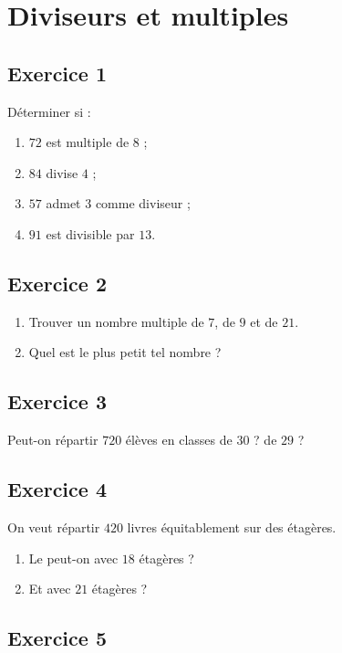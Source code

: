 \documentclass[12 pt]{article}
\theoremstyle{plain}
\newcounter{n}
\numberwithin{n}{section}
\begin{document}
\section*{Diviseurs et multiples}

\subsection*{Exercice 1}

Déterminer si : \begin{enumerate}
\item $72$ est multiple de $8$ ; 
\item $84$ divise $4$ ; 
\item $57$ admet $3$ comme diviseur ; 
\item $91$ est divisible par $13$. 
\end{enumerate}

\subsection*{Exercice 2}

\begin{enumerate}
\item Trouver un nombre multiple de $7$, de $9$ et de $21$. 
\item Quel est le plus petit tel nombre ? 
\end{enumerate}


\subsection*{Exercice 3}
Peut-on répartir $720$ élèves en classes de $30$ ? de $29$ ? 

\subsection*{Exercice 4}

On veut répartir $420$ livres équitablement sur des étagères. 
\begin{enumerate}
\item Le peut-on avec $18$ étagères ? 
\item Et avec $21$ étagères ? 
\end{enumerate}

\subsection*{Exercice 5}
\end{document}
